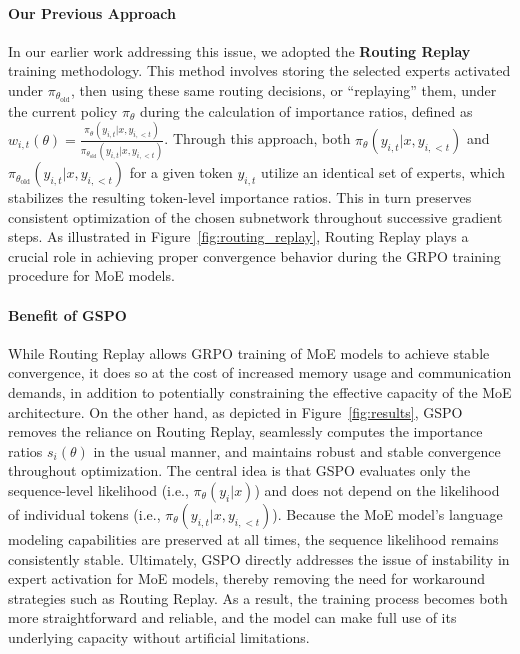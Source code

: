 \paragraph{Our Previous Approach} In our earlier work addressing this issue, we adopted the \textbf{Routing Replay} training methodology. This method involves storing the selected experts activated under $\pi_{\theta_\text{old}}$, then using these same routing decisions, or ``replaying'' them, under the current policy $\pi_{\theta}$ during the calculation of importance ratios, defined as $w_{i,t}(\theta) = \frac{ \pi_{\theta} (y_{i,t} | x, y_{i,<t}) }{ \pi_{\theta_\text{old}} (y_{i,t} | x,y_{i,<t})}$. Through this approach, both $\pi_{\theta} (y_{i,t} | x, y_{i,<t})$ and $\pi_{\theta_\text{old}} (y_{i,t} | x,y_{i,<t})$ for a given token $y_{i,t}$ utilize an identical set of experts, which stabilizes the resulting token-level importance ratios. This in turn preserves consistent optimization of the chosen subnetwork throughout successive gradient steps. As illustrated in Figure~\ref{fig:routing_replay}, Routing Replay plays a crucial role in achieving proper convergence behavior during the GRPO training procedure for MoE models.

\paragraph{Benefit of GSPO} While Routing Replay allows GRPO training of MoE models to achieve stable convergence, it does so at the cost of increased memory usage and communication demands, in addition to potentially constraining the effective capacity of the MoE architecture. On the other hand, as depicted in Figure~\ref{fig:results}, GSPO removes the reliance on Routing Replay, seamlessly computes the importance ratios $s_i(\theta)$ in the usual manner, and maintains robust and stable convergence throughout optimization. The central idea is that GSPO evaluates only the sequence-level likelihood (i.e., $\pi_{\theta} (y_i | x)$) and does not depend on the likelihood of individual tokens (i.e., $\pi_{\theta} (y_{i,t} | x, y_{i,<t})$). Because the MoE model's language modeling capabilities are preserved at all times, the sequence likelihood remains consistently stable. Ultimately, GSPO directly addresses the issue of instability in expert activation for MoE models, thereby removing the need for workaround strategies such as Routing Replay. As a result, the training process becomes both more straightforward and reliable, and the model can make full use of its underlying capacity without artificial limitations.


